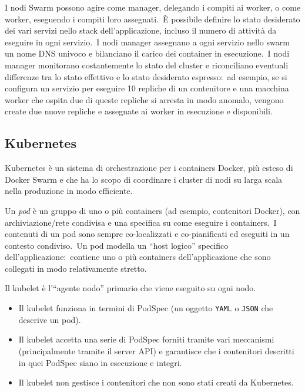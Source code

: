 \noindent I nodi Swarm possono agire come manager, delegando i compiti ai worker, o come worker, eseguendo i compiti loro assegnati.\
È possibile definire lo stato desiderato dei vari servizi nello stack dell'applicazione, incluso il numero di attività da eseguire in ogni servizio.\
I nodi manager assegnano a ogni servizio nello swarm un nome DNS univoco e bilanciano il carico dei container in esecuzione.\
I nodi manager monitorano costantemente lo stato del cluster e riconciliano eventuali differenze tra lo stato effettivo e lo stato desiderato espresso:\ ad esempio, se si configura un servizio per eseguire 10 repliche di un contenitore e una macchina worker che ospita due di queste repliche si arresta in modo anomalo, vengono create due nuove repliche e assegnate ai worker in esecuzione e disponibili.

\subsection{Kubernetes}
Kubernetes è un sistema di orchestrazione per i containers Docker, più esteso di Docker Swarm e che ha lo scopo di coordinare i cluster di nodi su larga scala nella produzione in modo efficiente.

Un \textit{pod} è un gruppo di uno o più containers (ad esempio, contenitori Docker), con archiviazione/rete condivisa e una specifica su come eseguire i containers.\
I contenuti di un pod sono sempre co-localizzati e co-pianificati ed eseguiti in un contesto condiviso.\
Un pod modella un ``host logico'' specifico dell'applicazione:\ contiene uno o più containers dell'applicazione che sono collegati in modo relativamente stretto.\

Il kubelet è l'``agente nodo'' primario che viene eseguito su ogni nodo.

\begin{itemize}
    \item Il kubelet funziona in termini di PodSpec (un oggetto \texttt{YAML} o \texttt{JSON} che descrive un pod).
    \item Il kubelet accetta una serie di PodSpec forniti tramite vari meccanismi (principalmente tramite il server API) e garantisce che i contenitori descritti in quei PodSpec siano in esecuzione e integri.
    \item Il kubelet non gestisce i contenitori che non sono stati creati da Kubernetes.
\end{itemize}

